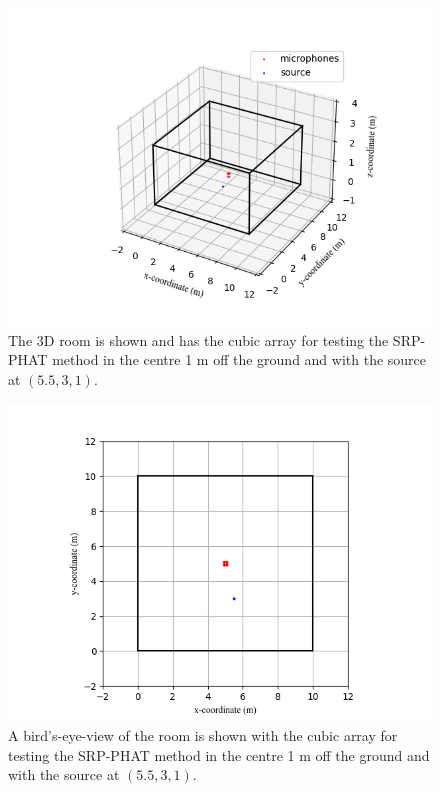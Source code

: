 \documentclass[notitlepage]{report}
\begin{document}
\begin{figure}[H]
\includegraphics[width=1\textwidth]{../Python/srp_phat/room_3d.png}
\centering
\caption{The 3D room is shown and has the cubic array for testing the SRP-PHAT method in the centre 1 \si{m} off the ground and with the source at $(5.5,3,1)$.}
\label{fig:srp_phat_room_3d}
\centering
\end{figure}

\begin{figure}[H]
\includegraphics[width=1\textwidth]{../Python/srp_phat/room_2d.png}
\centering
\caption{A bird's-eye-view of the room is shown with the cubic array for testing the SRP-PHAT method in the centre 1 \si{m} off the ground and with the source at $(5.5,3,1)$.}
\label{fig:srp_phat_room_2d}
\centering
\end{figure}
\end{document}
